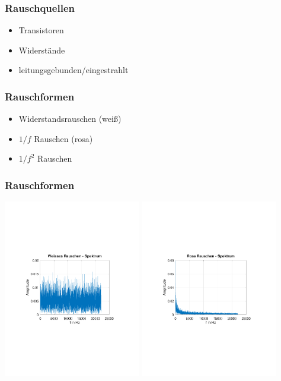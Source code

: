 \documentclass[aspectratio=32]{beamer}
\begin{document}
\begin{frame}
  \frametitle{Rauschquellen}
  \centering
  \begin{itemize}
    \item Transistoren 
    \item Widerstände
    \item leitungsgebunden/eingestrahlt
  \end{itemize}
\end{frame}

\begin{frame}
  \frametitle{Rauschformen}
  \begin{itemize}
    \item Widerstandsrauschen (weiß)
    \item $1/f$ Rauschen (rosa)
    \item $1/f^2$ Rauschen   
  \end{itemize}
\end{frame}

\begin{frame}
  \frametitle{Rauschformen}
  \centering
  \includegraphics[width=0.45\textwidth]{../common/Simulation/audioinput/white-spkt.pdf}
  \includegraphics[width=0.45\textwidth]{../common/Simulation/audioinput/pink-spkt.pdf}
\end{frame} 
\end{document}
